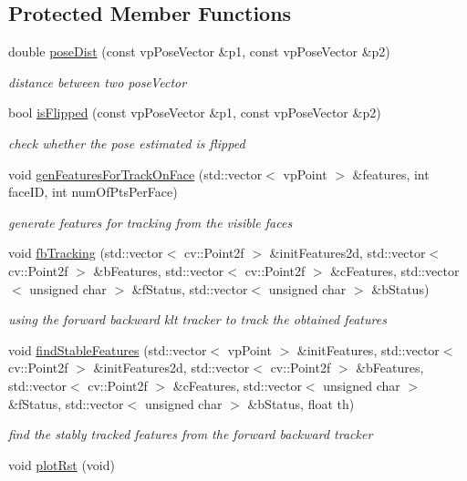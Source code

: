 \subsection*{\-Protected \-Member \-Functions}
\begin{DoxyCompactItemize}
\item 
double \hyperlink{classkltFbTracker_aa87fc08d64e0e4f60ef2b7ce73cb25e8}{pose\-Dist} (const vp\-Pose\-Vector \&p1, const vp\-Pose\-Vector \&p2)
\begin{DoxyCompactList}\small\item\em distance between two pose\-Vector \end{DoxyCompactList}\item 
bool \hyperlink{classkltFbTracker_a323a5591070b2b96caf99588f8a1222e}{is\-Flipped} (const vp\-Pose\-Vector \&p1, const vp\-Pose\-Vector \&p2)
\begin{DoxyCompactList}\small\item\em check whether the pose estimated is flipped \end{DoxyCompactList}\item 
void \hyperlink{classkltFbTracker_a709489510926fb6cd8a47b880cc4cdc3}{gen\-Features\-For\-Track\-On\-Face} (std\-::vector$<$ vp\-Point $>$ \&features, int face\-I\-D, int num\-Of\-Pts\-Per\-Face)
\begin{DoxyCompactList}\small\item\em generate features for tracking from the visible faces \end{DoxyCompactList}\item 
void \hyperlink{classkltFbTracker_a7c36cfa21a75b136d2275601cc1af8ad}{fb\-Tracking} (std\-::vector$<$ cv\-::\-Point2f $>$ \&init\-Features2d, std\-::vector$<$ cv\-::\-Point2f $>$ \&b\-Features, std\-::vector$<$ cv\-::\-Point2f $>$ \&c\-Features, std\-::vector$<$ unsigned char $>$ \&f\-Status, std\-::vector$<$ unsigned char $>$ \&b\-Status)
\begin{DoxyCompactList}\small\item\em using the forward backward klt tracker to track the obtained features \end{DoxyCompactList}\item 
void \hyperlink{classkltFbTracker_a900ed23e50fd2ecc58ff29b83ac25764}{find\-Stable\-Features} (std\-::vector$<$ vp\-Point $>$ \&init\-Features, std\-::vector$<$ cv\-::\-Point2f $>$ \&init\-Features2d, std\-::vector$<$ cv\-::\-Point2f $>$ \&b\-Features, std\-::vector$<$ cv\-::\-Point2f $>$ \&c\-Features, std\-::vector$<$ unsigned char $>$ \&f\-Status, std\-::vector$<$ unsigned char $>$ \&b\-Status, float th)
\begin{DoxyCompactList}\small\item\em find the stably tracked features from the forward backward tracker \end{DoxyCompactList}\item 
\hypertarget{classkltFbTracker_a9d4f973d649ffead5fa36f67ec316f93}{void \hyperlink{classkltFbTracker_a9d4f973d649ffead5fa36f67ec316f93}{plot\-Rst} (void)}\label{classkltFbTracker_a9d4f973d649ffead5fa36f67ec316f93}


\end{DoxyCompactItemize}
